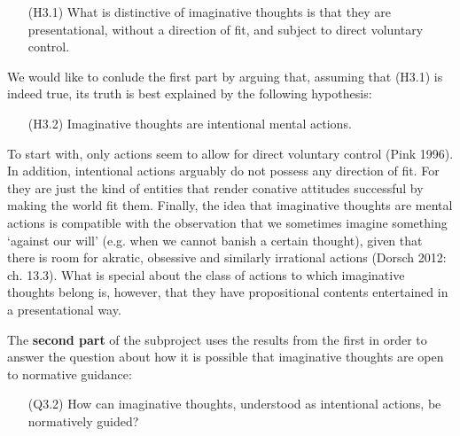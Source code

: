\vspace{-.1cm}
\begin{itemize}[leftmargin=2cm]
\item[(H3.1)] What is distinctive of imaginative thoughts is that they are presentational, without a direction of fit, and subject to direct
voluntary control.
\end{itemize}
\vspace{-.1cm}

\noindent We would like to conlude the first part by arguing that, assuming that (H3.1) is indeed true, its truth is best explained by the
following hypothesis:

\vspace{-.1cm}
\begin{itemize}[leftmargin=2cm]
\item[(H3.2)] Imaginative thoughts are intentional mental actions.
\end{itemize}
\vspace{-.1cm}

\noindent To start with, only actions seem to allow for direct voluntary control (Pink 1996). In addition, intentional actions arguably do not possess any direction of fit. For they are just the kind of entities that render conative attitudes successful by making the world fit them. Finally, the idea that imaginative thoughts are mental actions is compatible with the observation that we sometimes imagine something `against our will' (e.g. when we cannot banish a certain thought), given that there is room for akratic, obsessive and similarly irrational actions (Dorsch 2012: ch. 13.3). What is special about the class of actions to which imaginative thoughts belong is, however, that they have propositional contents entertained in a presentational way.

The \textbf{second part} of the subproject uses the results from the first in order to answer the question about how it is possible that imaginative thoughts are open to normative guidance:

\vspace{-.1cm}
\begin{itemize}[leftmargin=2cm]
\item[(Q3.2)] How can imaginative thoughts, understood as intentional actions, be normatively guided?
\end{itemize}
\vspace{-.1cm}

